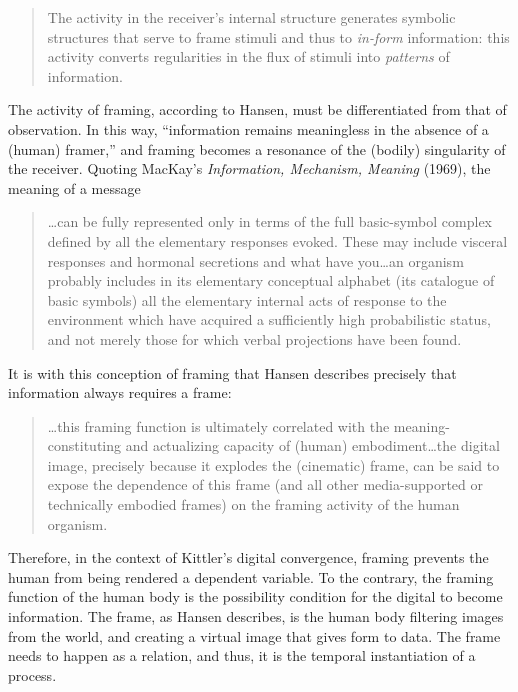 \begin{quote}
	The activity in the receiver's internal structure generates symbolic structures that serve to frame stimuli and thus to \textit{in-form} information: this activity converts regularities in the flux of stimuli into \textit{patterns} of information. \parencite[76]{Han02:Cin}
\end{quote}

The activity of framing, according to Hansen, must be differentiated from that of observation. In this way, ``information remains meaningless in the absence of a (human) framer,'' \parencite[77]{Han02:Cin} and framing becomes a resonance of the (bodily) singularity of the receiver. Quoting MacKay's \textit{Information, Mechanism, Meaning} (1969), the meaning of a message

\begin{quote}
	\dots can be fully represented only in terms of the full basic-symbol complex defined by all the elementary responses evoked. These may include visceral responses and hormonal secretions and what have you\dots an organism probably includes in its elementary conceptual alphabet (its catalogue of basic symbols) all the elementary internal acts of response to the environment which have acquired a sufficiently high probabilistic status, and not merely those for which verbal projections have been found. \parencite[78]{Han02:Cin}
\end{quote}

It is with this conception of framing that Hansen describes precisely that information always requires a frame:

\begin{quote}
	\dots this framing function is ultimately correlated with the meaning-constituting and actualizing capacity of (human) embodiment\dots the digital image, precisely because it explodes the (cinematic) frame, can be said to expose the dependence of this frame (and all other media-supported or technically embodied frames) on the framing activity of the human organism. \parencite[89-90]{Han02:Cin}
\end{quote}

Therefore, in the context of Kittler's digital convergence, framing prevents the human from being rendered a dependent variable. To the contrary, the framing function of the human body is the possibility condition for the digital to become information. The frame, as Hansen describes, is the human body filtering images from the world, and creating a virtual image that gives form to data. The frame needs to happen as a relation, and thus, it is the temporal instantiation of a process.
